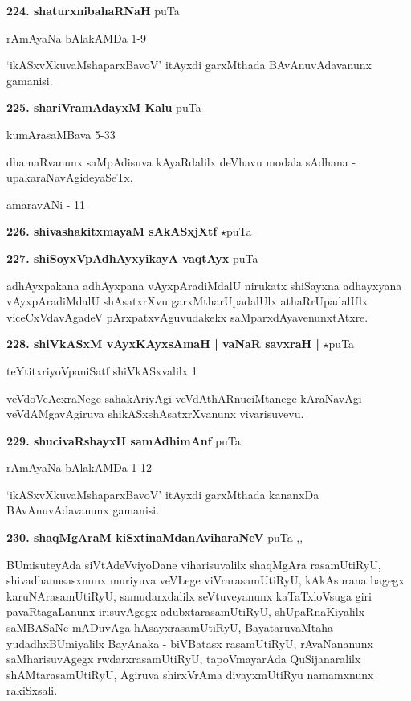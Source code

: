 \medskip
\noindent\textbf{224. shaturxnibahaRNaH} \hfill puTa \pageref{250f}

\hfill rAmAyaNa bAlakAMDa 1-9

`ikASxvXkuvaMshaparxBavoV' itAyxdi garxMthada BAvAnuvAdavanunx gamanisi.

\medskip
\noindent\textbf{225. shariVramAdayxM Kalu} \hfill puTa \pageref{76d}

\hfill kumArasaMBava 5-33

dhamaRvanunx saMpAdisuva kAyaRdalilx deVhavu modala sAdhana - upakaraNavAgideyaSeTx. 

\hfill amaravANi - 11

\medskip
\noindent\textbf{226. shivashakitxmayaM sAkASxjXtf} $\star$\hfill puTa \pageref{32b}

\medskip
\noindent\textbf{227. shiSoyxVpAdhAyxyikayA vaqtAyx} \hfill puTa \pageref{45a}

adhAyxpakana adhAyxpana vAyxpAradiMdalU nirukatx shiSayxna adhayxyana vAyxpAradiMdalU shAsatxrXvu garxMtharUpadalUlx athaRrUpadalUlx viceCxVdavAgadeV pArxpatxvAguvudakekx saMparxdAyavenunxtAtxre.

\medskip
\noindent\textbf{228. shiVkASxM vAyxKAyxsAmaH | vaNaR savxraH |} $\star$\hfill puTa \pageref{10a}

\hfill teYtitxriyoVpaniSatf shiVkASxvalilx 1

veVdoVcAcxraNege sahakAriyAgi veVdAthARnuciMtanege kAraNavAgi veVdAMgavAgiruva shikASxshAsatxrXvanunx vivarisuvevu.

\medskip
\noindent\textbf{229. shucivaRshayxH samAdhimAnf} \hfill puTa \pageref{255}

\hfill rAmAyaNa bAlakAMDa 1-12

`ikASxvXkuvaMshaparxBavoV' itAyxdi garxMthada kananxDa BAvAnuvAdavanunx gamanisi.

\medskip
\noindent\textbf{230. shaqMgAraM kiSxtinaMdanAviharaNeV} \hfill puTa \pageref{182a},\pageref{208c},\pageref{219b}

BUmisuteyAda siVtAdeVviyoDane viharisuvalilx shaqMgAra rasamUtiRyU, shivadhanusasxnunx muriyuva veVLege viVrarasamUtiRyU, kAkAsurana bagegx karuNArasamUtiRyU, samudarxdalilx seVtuveyanunx kaTaTxloVsuga giri pavaRtagaLanunx irisuvAgegx adubxtarasamUtiRyU, shUpaRnaKiyalilx saMBASaNe mADuvAga hAsayxrasamUtiRyU, BayataruvaMtaha yudadhxBUmiyalilx BayAnaka - biVBatasx rasamUtiRyU, rAvaNananunx saMharisuvAgegx rwdarxrasamUtiRyU, tapoVmayarAda QuSijanaralilx shAMtarasamUtiRyU, Agiruva shirxVrAma divayxmUtiRyu namamxnunx rakiSxsali.

